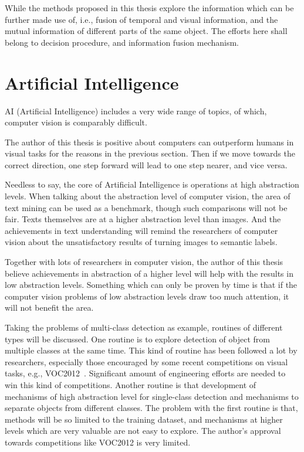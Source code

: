 While the methods proposed in this thesis explore the information which can be further made use of, i.e., fusion of temporal and visual information, and the mutual information of different parts of the same object. The efforts here shall belong to decision procedure, and information fusion mechanism.

\section{Artificial Intelligence}
AI (Artificial Intelligence) includes a very wide range of topics, of which, computer vision is comparably difficult.

The author of this thesis is positive about computers can outperform humans in visual tasks for the reasons in the previous section. Then if we move towards the correct direction, one step forward will lead to one step nearer, and vice versa.

Needless to say, the core of Artificial Intelligence is operations at high abstraction levels. When talking about the abstraction level of computer vision, the area of text mining can be used as a benchmark, though such comparisons will not be fair. Texts themselves are at a higher abstraction level than images. And the achievements in text understanding will remind the researchers of computer vision about the unsatisfactory results of turning images to semantic labels.

Together with lots of researchers in computer vision, the author of this thesis believe achievements in abstraction of a higher level will help with the results in low abstraction levels. Something which can only be proven by time is that if the computer vision problems of low abstraction levels draw too much attention, it will not benefit the area.


Taking the problems of multi-class detection as example, routines of different types will be discussed. One routine is to explore detection of object from multiple classes at the same time. This kind of routine has been followed a lot by researchers, especially those encouraged by some recent competitions on visual tasks, e.g., VOC2012~\citep{voc}. Significant amount of engineering efforts are needed to win this kind of competitions. Another routine is that
development of mechanisms of high abstraction level for single-class detection and mechanisms to separate objects from different classes. The problem with the first routine is that, methods will be so limited to the training dataset, and mechanisms at higher levels which are very valuable are not easy to explore. The author's approval towards competitions like VOC2012 is very limited.

